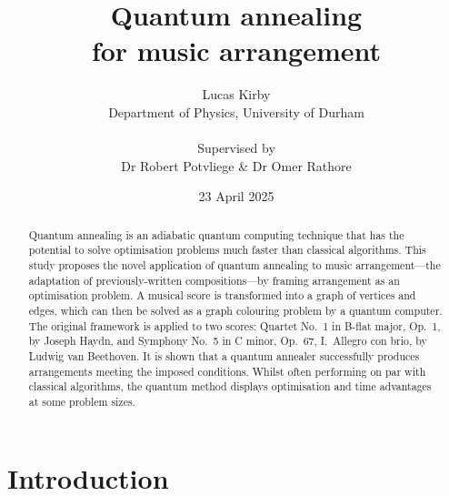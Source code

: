 \documentclass[12pt]{article}
\title{\Huge \bfseries Quantum annealing\\for music arrangement}
\author{Lucas Kirby\\\normalsize Department of Physics, University of Durham\\\\\normalsize Supervised by\\\normalsize Dr Robert Potvliege \& Dr Omer Rathore}
\date{\normalsize 23 April 2025}
\theoremstyle{definition}
\begin{document}
\maketitle

\vfill

\begin{center}
\begin{abstract}              

Quantum annealing is an adiabatic quantum computing technique that has the potential to solve optimisation problems much faster than classical algorithms. This study proposes the novel application of quantum annealing to music arrangement---the adaptation of previously-written compositions---by framing arrangement as an optimisation problem. A musical score is transformed into a graph of vertices and edges, which can then be solved as a graph colouring problem by a quantum computer. The original framework is applied to two scores: Quartet No.\ 1 in B-flat major, Op.\ 1, by Joseph Haydn, and Symphony No.\ 5 in C minor, Op.\ 67, I.\ Allegro con brio, by Ludwig van Beethoven. It is shown that a quantum annealer successfully produces arrangements meeting the imposed conditions. Whilst often performing on par with classical algorithms, the quantum method displays optimisation and time advantages at some problem sizes.

\end{abstract}

\vfill



\end{center}

\thispagestyle{empty}
\clearpage

\tableofcontents

\thispagestyle{empty}
\clearpage

\section{Introduction}
\end{document}

